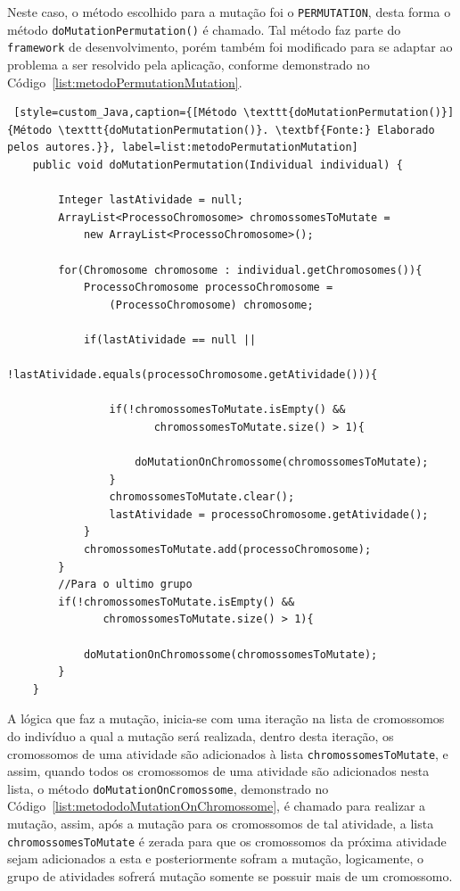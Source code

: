 \par Neste caso, o método escolhido para a mutação foi o \texttt{PERMUTATION}, desta forma o método \texttt{doMutationPermutation()} é chamado.
Tal método faz parte do \texttt{framework} de desenvolvimento, porém também foi modificado para se adaptar ao problema a ser resolvido pela 
aplicação, conforme demonstrado no Código~\ref{list:metodoPermutationMutation}.


\begin{lstlisting} [style=custom_Java,caption={[Método \texttt{doMutationPermutation()}]{Método \texttt{doMutationPermutation()}. \textbf{Fonte:} Elaborado pelos autores.}}, label=list:metodoPermutationMutation] 
	public void doMutationPermutation(Individual individual) {
	
		Integer lastAtividade = null;
		ArrayList<ProcessoChromosome> chromossomesToMutate = 
			new ArrayList<ProcessoChromosome>(); 
		
		for(Chromosome chromosome : individual.getChromosomes()){
			ProcessoChromosome processoChromosome = 
				(ProcessoChromosome) chromosome;
			
			if(lastAtividade == null || 
				   !lastAtividade.equals(processoChromosome.getAtividade())){
				   
				if(!chromossomesToMutate.isEmpty() && 
					   chromossomesToMutate.size() > 1){
					
					doMutationOnChromossome(chromossomesToMutate);
				}
				chromossomesToMutate.clear();
				lastAtividade = processoChromosome.getAtividade();
			}
			chromossomesToMutate.add(processoChromosome);
		}
		//Para o ultimo grupo
		if(!chromossomesToMutate.isEmpty() && 
			   chromossomesToMutate.size() > 1){
			
			doMutationOnChromossome(chromossomesToMutate);
		}
	}

\end{lstlisting}

\par A lógica que faz a mutação, inicia-se com uma iteração na lista de cromossomos do 
indivíduo a qual a mutação será realizada, dentro desta iteração, os cromossomos de uma atividade são adicionados
à lista \texttt{chromossomesToMutate}, e assim, quando todos os cromossomos de uma atividade são adicionados nesta
lista, o método \texttt{doMutationOnCromossome}, demonstrado no Código~\ref{list:metododoMutationOnChromossome}, é
chamado para realizar a mutação, assim, após a mutação para os cromossomos de tal atividade, a lista \texttt{chromossomesToMutate} é zerada para que os cromossomos da próxima atividade sejam adicionados a esta e posteriormente sofram a mutação, logicamente, o grupo de atividades sofrerá mutação somente se possuir mais de um cromossomo.

